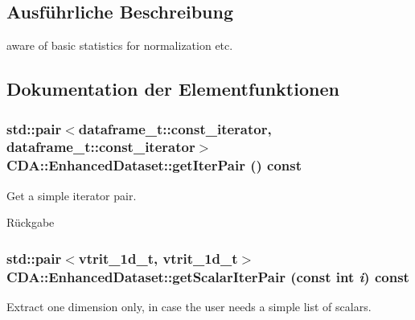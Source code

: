 \subsection{Ausführliche Beschreibung}
aware of basic statistics for normalization etc. 

\subsection{Dokumentation der Elementfunktionen}
\hypertarget{classCDA_1_1EnhancedDataset_a7545c4c91dff1ccea71b02b5acdba507}{
\subsubsection[{getIterPair}]{\setlength{\rightskip}{0pt plus 5cm}std::pair$<$dataframe\_\-t::const\_\-iterator, dataframe\_\-t::const\_\-iterator$>$ CDA::EnhancedDataset::getIterPair () const}}
\label{classCDA_1_1EnhancedDataset_a7545c4c91dff1ccea71b02b5acdba507}


Get a simple iterator pair. 

\begin{DoxyReturn}{Rückgabe}

\end{DoxyReturn}
\hypertarget{classCDA_1_1EnhancedDataset_ae94abbc9c4249e7c8dd7219e94c2d387}{
\subsubsection[{getScalarIterPair}]{\setlength{\rightskip}{0pt plus 5cm}std::pair$<$vtrit\_\-1d\_\-t, vtrit\_\-1d\_\-t$>$ CDA::EnhancedDataset::getScalarIterPair (const int {\em i}) const}}
\label{classCDA_1_1EnhancedDataset_ae94abbc9c4249e7c8dd7219e94c2d387}


Extract one dimension only, in case the user needs a simple list of scalars. 


